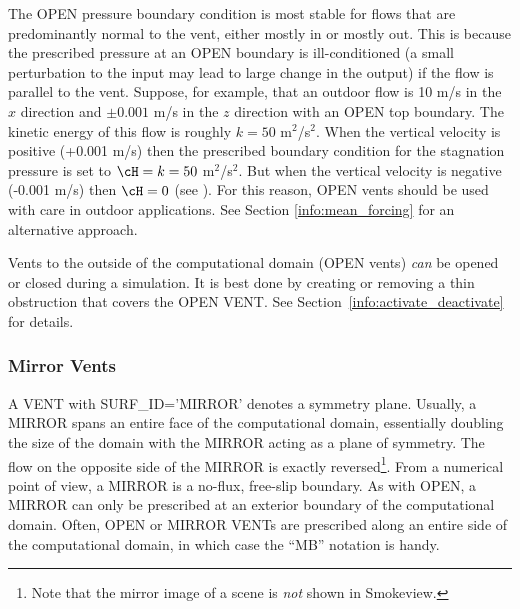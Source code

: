 \documentclass[11pt]{book}
\begin{document}
The {\ct OPEN} pressure boundary condition is most stable for flows that are predominantly normal  to the vent, either mostly in or mostly out.  This is because the prescribed pressure at an {\ct OPEN} boundary is ill-conditioned (a small perturbation to the input may lead to large change in the output) if the flow is parallel to the vent.  Suppose, for example, that an outdoor flow is 10 m/s in the $x$ direction and $\pm 0.001$ m/s in the $z$ direction with an {\ct OPEN} top boundary.  The kinetic energy of this flow is roughly $k=50$ m$^2$/s$^2$.  When the vertical velocity is positive (+0.001 m/s) then the prescribed boundary condition for the stagnation pressure is set to $\cH = k = 50$ m$^2$/s$^2$.  But when the vertical velocity is negative (-0.001 m/s) then $\cH = 0$ (see \cite{FDS_Tech_Guide}).  For this reason, {\ct OPEN} vents should be used with care in outdoor applications.  See Section \ref{info:mean_forcing} for an alternative approach.


Vents to the outside of the computational domain ({\ct OPEN} vents)
{\em  can} be opened or closed during a simulation. It is best done by creating or removing a thin obstruction that covers the {\ct OPEN VENT}.
See Section~\ref{info:activate_deactivate} for details.


\subsubsection{Mirror Vents}

A {\ct VENT} with {\ct SURF\_ID='MIRROR'} denotes a symmetry plane. Usually, a {\ct MIRROR} spans an entire face of the computational domain, essentially doubling the size of the domain with the {\ct MIRROR} acting as a plane of symmetry. The flow on the opposite side of the {\ct MIRROR} is exactly reversed\footnote{Note that the mirror image of a scene is {\em not} shown in Smokeview.}. From a numerical point of view, a {\ct MIRROR} is a no-flux, free-slip boundary. As with {\ct OPEN}, a {\ct MIRROR} can only be prescribed at an exterior boundary of the computational domain. Often, {\ct OPEN} or {\ct MIRROR} {\ct VENT}s are prescribed along an entire side of the computational domain, in which case the ``{\ct MB}'' notation is handy.
\end{document}
